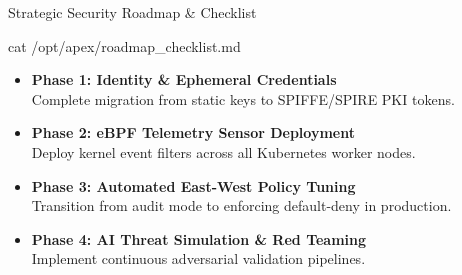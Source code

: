 \documentclass[aspectratio=169, 10pt]{beamer}
\begin{document}
\begin{frame}{Strategic Security Roadmap \& Checklist}
  \begin{terminalbox}{cat /opt/apex/roadmap\_checklist.md}
    \begin{itemize}
      \item[\color{cybergreen}\ttfamily \lbrack X\rbrack] {\bfseries Phase 1: Identity \& Ephemeral Credentials} \\
      {\color{textmuted}\small Complete migration from static keys to SPIFFE/SPIRE PKI tokens.} \vspace{2pt}
      
      \item[\color{cybergreen}\ttfamily \lbrack X\rbrack] {\bfseries Phase 2: eBPF Telemetry Sensor Deployment} \\
      {\color{textmuted}\small Deploy kernel event filters across all Kubernetes worker nodes.} \vspace{2pt}
      
      \item[\color{cyberamber}\ttfamily \lbrack >\rbrack] {\bfseries Phase 3: Automated East-West Policy Tuning} \\
      {\color{textmuted}\small Transition from audit mode to enforcing default-deny in production.} \vspace{2pt}
      
      \item[\color{cybercyan}\ttfamily \lbrack\ \rbrack] {\bfseries Phase 4: AI Threat Simulation \& Red Teaming} \\
      {\color{textmuted}\small Implement continuous adversarial validation pipelines.}
    \end{itemize}
  \end{terminalbox}
\end{frame}
\end{document}
